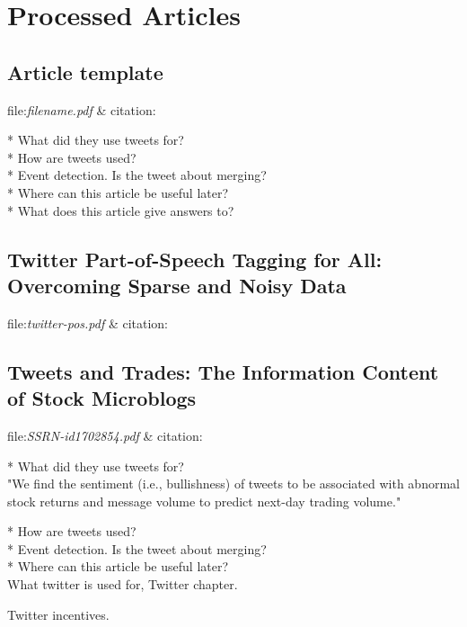 \chapter{Processed Articles}

\section{Article template}
file:\textit{filename.pdf} & citation:\cite[]{}  

* What did they use tweets for?\\
* How are tweets used?\\
* Event detection. Is the tweet about merging? \\
* Where can this article be useful later? \\
* What does this article give answers to?\\


\section{Twitter Part-of-Speech Tagging for All: Overcoming Sparse and Noisy
Data}
file:\textit{twitter-pos.pdf} & citation:\cite[]{twitter-pos}



\section{Tweets and Trades: The Information Content of Stock Microblogs}
file:\textit{SSRN-id1702854.pdf} & citation:\cite[]{sprenger10} %

* What did they use tweets for?\\
"We find the sentiment (i.e., bullishness) of tweets to be associated with abnormal
stock returns and message volume to predict next-day trading volume."
\cite[]{sprenger10} 

* How are tweets used?\\

* Event detection. Is the tweet about merging? \\

* Where can this article be useful later? \\
What twitter is used for, Twitter chapter. 

Twitter incentives. \cite[p4]{sprenger10}

